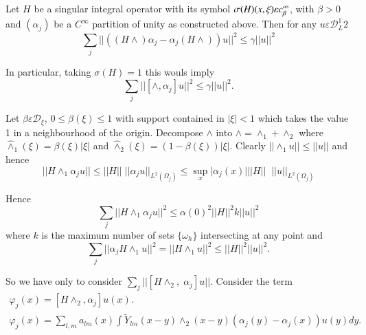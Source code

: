 \begin{lemma}\label{chap3-sec5-lem2}%
Let $H$ be a singular integral operator with its symbol $ \sigma (H)\break
(x, \xi) \varepsilon c^\infty_\beta$, with $\beta > 0 $ and
$(\alpha_j) $ be a $C^\infty$ partition of unity as constructed
above. Then for any $u \varepsilon \mathscr{D}_L^1 2$ 
\begin{equation}
\sum_j ||((H \wedge) \alpha_j - \alpha_j (H \wedge )) u ||^2 \leq
\gamma ||u||^2 \tag{5.6} \label{chap3-eq5.6}
\end{equation}

In particular, taking $\sigma (H) = 1$ this wouls imply 
\begin{equation}
\sum_j || [ \wedge , \alpha_j ] u || ^2 \le \gamma || u||^2.
\tag{5.7}\label{chap3-eq5.7} 
\end{equation}
\end{lemma}

Let $\beta \varepsilon \mathscr{D}_\xi$, \; $0 \leq \beta (\xi) \leq 1$
with support contained in $|\xi| < 1 $ which takes the value 1 in a
neighbourhood of the origin. Decompose $\wedge$ into $\wedge =
\wedge_1 + \wedge_2$ where $\hat\wedge_1 (\xi) = \beta (\xi) | \xi |$
and $\hat{\wedge}_2 (\xi) = (1-\beta (\xi) )|\xi|$.
Clearly $|| \wedge_1 u || \leq || u ||$ and hence  
$$
||H \wedge_1 \alpha_j u || \leq || H || \; || \alpha_j u ||_{L^2
  (\Omega_j)} \leq \sup\limits_{x} \big|\alpha_j (x) \big| || H ||\;\;
 || u||_{L^2(\Omega_j)}  
$$\pageoriginale

Hence 
$$
\sum\limits_j || H \wedge_1 \alpha_j u ||^2 \leq \alpha (0)^2 || H
||^2  k || u ||^2  
$$
where $k$ is the maximum number of sets $\{\omega_h\}$
 intersecting at any point and 
 $$
 \sum_j || \alpha_j H \wedge_1 u ||^2 = || H \wedge_1 u ||^2 \leq || H
 ||^2 || u ||^2.  
 $$

 So we have only to consider $\sum\limits_{j}|| [H \wedge_2, \; 
   \alpha_j ]u ||$. Consider the term  
 \begin{gather*}
\varphi_j (x) = [ H\wedge_2, \alpha_j ] u
(x). \tag{5.8}\label{chap3-eq5.8} \\ 
 \varphi_j (x) = \sum\limits_{l, m} a_{lm }(x) \int \tilde{Y}_{lm}
 (x-y) \wedge_2 (x-y) (\alpha_j(y) - \alpha_j (x)) u (y) dy.  
 \end{gather*}

